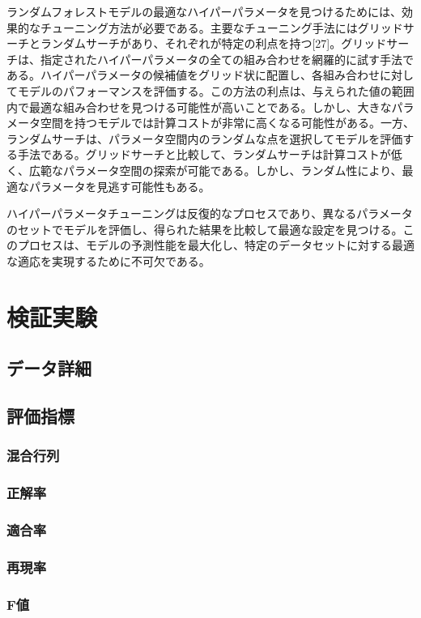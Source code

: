 \documentclass[platex]{suribt}
\begin{document}
ランダムフォレストモデルの最適なハイパーパラメータを見つけるためには、効果的なチューニング方法が必要である。主要なチューニング手法にはグリッドサーチとランダムサーチがあり、それぞれが特定の利点を持つ[27]。グリッドサーチは、指定されたハイパーパラメータの全ての組み合わせを網羅的に試す手法である。ハイパーパラメータの候補値をグリッド状に配置し、各組み合わせに対してモデルのパフォーマンスを評価する。この方法の利点は、与えられた値の範囲内で最適な組み合わせを見つける可能性が高いことである。しかし、大きなパラメータ空間を持つモデルでは計算コストが非常に高くなる可能性がある。一方、ランダムサーチは、パラメータ空間内のランダムな点を選択してモデルを評価する手法である。グリッドサーチと比較して、ランダムサーチは計算コストが低く、広範なパラメータ空間の探索が可能である。しかし、ランダム性により、最適なパラメータを見逃す可能性もある。

ハイパーパラメータチューニングは反復的なプロセスであり、異なるパラメータのセットでモデルを評価し、得られた結果を比較して最適な設定を見つける。このプロセスは、モデルの予測性能を最大化し、特定のデータセットに対する最適な適応を実現するために不可欠である。


\chapter{検証実験}
\section{データ詳細}
\section{評価指標}
\subsection{混合行列}
\subsection{正解率}
\subsection{適合率}
\subsection{再現率}
\subsection{F値}
\end{document}
